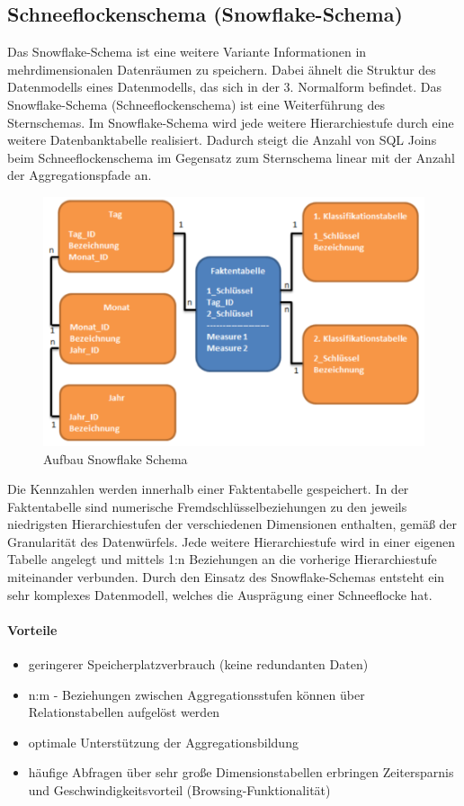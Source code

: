 \subsection{Schneeflockenschema (Snowflake-Schema)}

Das Snowflake-Schema ist eine weitere Variante Informationen in mehrdimensionalen Datenräumen zu speichern. Dabei ähnelt die Struktur des Datenmodells eines Datenmodells, das sich in der 3. Normalform befindet.
Das Snowflake-Schema (Schneeflockenschema) ist eine Weiterführung des Sternschemas. Im Snowflake-Schema wird jede weitere Hierarchiestufe durch eine weitere Datenbanktabelle realisiert.
Dadurch steigt die Anzahl von SQL Joins beim Schneeflockenschema im Gegensatz zum Sternschema linear mit der Anzahl der Aggregationspfade an.

\begin{figure}[h]
    \centering
    \includegraphics[width=.8\textwidth]{Content/images/modellierung/snow.png}
    \caption{Aufbau Snowflake Schema}
    \label{fig:modellierung:snow}
\end{figure}

Die Kennzahlen werden innerhalb einer Faktentabelle gespeichert. In der Faktentabelle sind numerische Fremdschlüsselbeziehungen zu den jeweils niedrigsten Hierarchiestufen der verschiedenen Dimensionen enthalten, gemäß der Granularität des Datenwürfels.
Jede weitere Hierarchiestufe wird in einer eigenen Tabelle angelegt und mittels 1:n Beziehungen an die vorherige Hierarchiestufe miteinander verbunden. Durch den Einsatz des Snowflake-Schemas entsteht ein sehr komplexes Datenmodell, welches die Ausprägung einer Schneeflocke hat.

\paragraph{Vorteile}
\begin{itemize}
    \item geringerer Speicherplatzverbrauch (keine redundanten Daten)
    \item n:m - Beziehungen zwischen Aggregationsstufen können über Relationstabellen aufgelöst werden
    \item optimale Unterstützung der Aggregationsbildung
    \item häufige Abfragen über sehr große Dimensionstabellen erbringen Zeitersparnis und Geschwindigkeitsvorteil (Browsing-Funktionalität)

\end{itemize}

